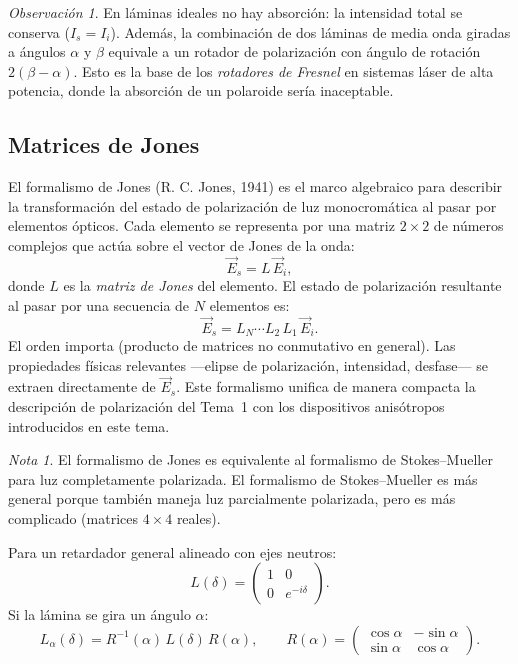 \documentclass[12pt, a4paper]{article}
\theoremstyle{plain}
\theoremstyle{definition}
\theoremstyle{remark}
\newtheorem*{nota}{Nota}
\newtheorem*{observacion}{Observación}
\newcommand{\ve}[1]{\vec{#1}}
\begin{document}
\begin{observacion}
En láminas ideales no hay absorción: la intensidad total se conserva
($I_s=I_i$). Además, la combinación de dos láminas de media onda giradas
a ángulos $\alpha$ y $\beta$ equivale a un rotador de polarización con
ángulo de rotación $2(\beta - \alpha)$. Esto es la base de los
\emph{rotadores de Fresnel} en sistemas láser de alta potencia, donde la
absorción de un polaroide sería inaceptable.
\end{observacion}

\subsection{Matrices de Jones}

El formalismo de Jones (R. C. Jones, 1941) es el marco algebraico para
describir la transformación del estado de polarización de luz monocromática
al pasar por elementos ópticos. Cada elemento se representa por una matriz
$2\times 2$ de números complejos que actúa sobre el vector de Jones de la
onda:
\[
  \ve{E}_s = L\,\ve{E}_i,
\]
donde $L$ es la \emph{matriz de Jones} del elemento. El estado de
polarización resultante al pasar por una secuencia de $N$ elementos es:
\[
  \ve{E}_s = L_N \cdots L_2\, L_1\,\ve{E}_i.
\]
El orden importa (producto de matrices no conmutativo en general). Las
propiedades físicas relevantes —elipse de polarización, intensidad, desfase—
se extraen directamente de $\ve{E}_s$.
Este formalismo unifica de manera compacta la descripción de polarización del
Tema~1 con los dispositivos anisótropos introducidos en este tema.

\begin{nota}
El formalismo de Jones es equivalente al formalismo de Stokes--Mueller para
luz completamente polarizada. El formalismo de Stokes--Mueller es más general
porque también maneja luz parcialmente polarizada, pero es más complicado
(matrices $4\times 4$ reales).
\end{nota}

Para un retardador general alineado con ejes neutros:
\[
  L(\delta)=
  \begin{pmatrix}
    1 & 0\\
    0 & e^{-i\delta}
  \end{pmatrix}.
\]
Si la lámina se gira un ángulo $\alpha$:
\begin{equation}
  L_\alpha(\delta)=R^{-1}(\alpha)\,L(\delta)\,R(\alpha),
  \qquad
  R(\alpha)=
  \begin{pmatrix}
    \cos\alpha & -\sin\alpha\\
    \sin\alpha & \cos\alpha
  \end{pmatrix}.
  \label{eq:jones_rotada}
\end{equation}
\end{document}
